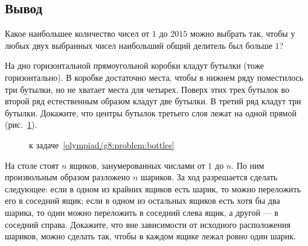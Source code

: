 \subsection*{Вывод}

\begin{problems}

\item
Какое наибольшее количество чисел от $1$ до $2015$ можно выбрать так, чтобы
у любых двух выбранных чисел наибольший общий делитель был больше $1$?

\item
\label{olympiad/g8:problem:bottles}%
На дно горизонтальной прямоугольной коробки кладут бутылки
(тоже горизонтально).
В коробке достаточно места, чтобы в нижнем ряду поместилось три бутылки,
но не хватает места для четырех.
Поверх этих трех бутылок во второй ряд естественным образом кладут две бутылки.
В третий ряд кладут три бутылки.
Докажите, что центры бутылок третьего слоя лежат на одной прямой
(рис.~\ref{olympiad/g8:problem:bottles:fig}).

\begin{figure}[ht]\begin{center}
    \caption{к задаче~\ref{olympiad/g8:problem:bottles}}
    \label{olympiad/g8:problem:bottles:fig}
\end{center}\end{figure}

\item
На столе стоят $n$ ящиков, занумерованных числами от $1$ до $n$.
По ним произвольным образом разложено $n$ шариков.
За ход разрешается сделать следующее: если в одном из крайних ящиков есть
шарик, то можно переложить его в соседний ящик;
если в одном из остальных ящиков есть хотя бы два шарика, то один можно
переложить в соседний слева ящик, а другой --- в соседний справа.
Докажите, что вне зависимости от исходного расположения шариков, можно сделать
так, чтобы в каждом ящике лежал ровно один шарик.

\end{problems}

